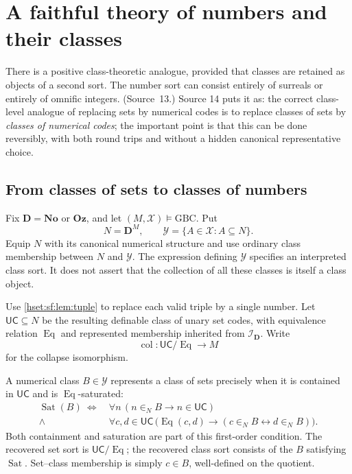 \documentclass[11pt,letterpaper]{article}
\theoremstyle{definition}
\theoremstyle{remark}
\newcommand{\No}{\mathbf{No}}
\newcommand{\I}{\mathcal I}
\newcommand{\Oz}{\mathbf{Oz}}
\newcommand{\GBC}{\mathrm{GBC}}
\newcommand{\Eqc}{\operatorname{Eq}}
\newcommand{\Sat}{\operatorname{Sat}}
\newcommand{\UC}{\mathsf{UC}}
\newcommand{\Dd}{\mathbf{D}}
\begin{document}
\section{A faithful theory of numbers and their classes}
\label{hset:sf:sec:classlift}

There is a positive class-theoretic analogue, provided that classes are retained as
objects of a second sort. The number sort can consist entirely of surreals or
entirely of omnific integers. (Source~13.) Source 14 puts it as: the correct
class-level analogue of replacing sets by numerical codes is to replace classes of
sets by \emph{classes of numerical codes}; the important point is that this can be
done reversibly, with both round trips and without a hidden canonical
representative choice.

\subsection{From classes of sets to classes of numbers}

Fix $\Dd=\No$ or $\Oz$, and let $(M,\mathcal X)\models\GBC$. Put
\[
 N=\Dd^M,\qquad \mathcal Y=\{A\in\mathcal X:A\subseteq N\}.
\]
Equip $N$ with its canonical numerical structure and use ordinary class membership
between $N$ and $\mathcal Y$. The expression defining $\mathcal Y$ specifies an
interpreted class sort. It does not assert that the collection of all these classes
is itself a class object.

Use \cref{hset:sf:lem:tuple} to replace each valid triple by a single number. Let
$\UC\subseteq N$ be the resulting definable class of unary set codes, with
equivalence relation $\Eqc$ and represented membership inherited from $\I_{\Dd}$.
Write
\[
 \operatorname{col}:\UC/{\Eqc}\longrightarrow M
\]
for the collapse isomorphism.

A numerical class $B\in\mathcal Y$ represents a class of sets precisely when it is
contained in $\UC$ and is $\Eqc$-saturated:
\[
\begin{split}
 \Sat(B)\ \Longleftrightarrow\ &\forall n\,(n\in_N B\to n\in \UC)\\
 {}\land{}&\forall c,d\in \UC\,\bigl(\Eqc(c,d)\to(c\in_N B\leftrightarrow d\in_N B)\bigr).
\end{split}
\]
Both containment and saturation are part of this first-order condition. The
recovered set sort is $\UC/{\Eqc}$; the recovered class sort consists of the $B$
satisfying $\Sat$. Set--class membership is simply $c\in B$, well-defined on the
quotient.
\end{document}
